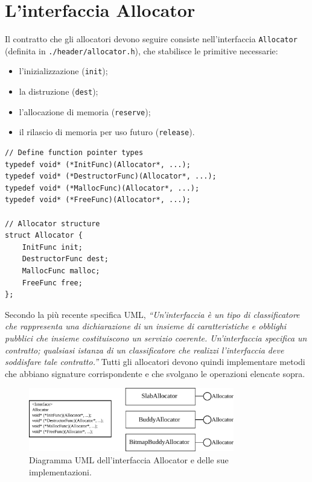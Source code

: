 \section{L’interfaccia Allocator}
Il contratto che gli allocatori devono seguire consiste nell’interfaccia \texttt{Allocator} (definita in \texttt{./header/allocator.h}), che stabilisce le primitive necessarie:
\begin{itemize}
    \item l’inizializzazione (\texttt{init});
    \item la distruzione (\texttt{dest});
    \item l’allocazione di memoria (\texttt{reserve});
    \item il rilascio di memoria per uso futuro (\texttt{release}).
\end{itemize}

\begin{lstlisting}
// Define function pointer types
typedef void* (*InitFunc)(Allocator*, ...);
typedef void* (*DestructorFunc)(Allocator*, ...);
typedef void* (*MallocFunc)(Allocator*, ...);  
typedef void* (*FreeFunc)(Allocator*, ...); 

// Allocator structure
struct Allocator {
    InitFunc init; 
    DestructorFunc dest;
    MallocFunc malloc;
    FreeFunc free; 
};
\end{lstlisting}

Secondo la più recente specifica UML, \textit{“Un'interfaccia è un tipo di classificatore che rappresenta una dichiarazione di un insieme di caratteristiche e obblighi pubblici che insieme costituiscono un servizio coerente. Un'interfaccia specifica un contratto; qualsiasi istanza di un classificatore che realizzi l'interfaccia deve soddisfare tale contratto.”} Tutti gli allocatori devono quindi implementare metodi che abbiano signature corrispondente e che svolgano le operazioni elencate sopra.

\begin{figure}[H]
    \centering
    \includegraphics[width=0.8\textwidth]{images/allocator_interface_uml.pdf}
    \caption{Diagramma UML dell'interfaccia Allocator e delle sue implementazioni.}
    \label{fig:uml_allocator_interface}
\end{figure}

